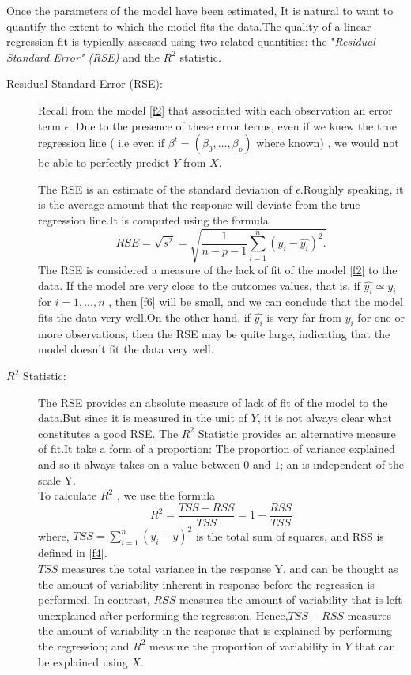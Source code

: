 \documentclass[12pt]{report}
\renewcommand{\emph}{\textit}
\begin{document}
	Once the parameters of the model have been estimated, It is natural to want to quantify the extent to which the model fits the data.The quality of a linear regression fit is typically assessed using two related quantities: the "\emph{Residual Standard Error" (RSE)} and the $R^{2}$ statistic.
	\begin{description}
		\item[Residual Standard Error (RSE):] Recall from the model \eqref{f2}  that associated with each observation an error term $\epsilon$ .Due to the presence of these error terms, even if we knew the true regression line ( i.e even if $\beta^{t}=(\beta_{0},...,\beta_{p})$ where known) , we would not be able to perfectly predict $Y$ from $X$.
		
		The RSE is an estimate of the standard deviation of $\epsilon$.Roughly speaking, it is the average amount that the response will deviate from the true regression line.It is computed using the formula
		\begin{equation}
			RSE=\sqrt{s^{2}}=\sqrt{\frac{1}{n-p-1}\sum_{i=1}^{n}(y_{i}-\hat{y_{i}})^{2}.
			} \label{f6}
		\end{equation}
		The RSE is considered a measure of the  lack of fit of the model \eqref{f2} to the data. If the model are very close to the outcomes values, that is, if $\hat{y_{i}}\simeq y_{i}$ for $i=1,...,n$ , then \eqref{f6} will be small, and we can conclude that the model fits the data very well.On the other hand, if $\hat{y_{i}}$  is very far from $y_{i}$  for one or more observations, then the RSE may be quite large, indicating that the model doesn't fit the data very well.
		\item[$R^{2}$ Statistic:] The RSE provides an absolute measure of lack of fit of the model to the data.But since it is measured in the unit of $Y$, it is not always clear what constitutes a good RSE. The $R^{2}$ Statistic provides an alternative measure of fit.It take a form of a proportion: The proportion of variance explained and so it always takes on a value between $0$ and $1$; an is independent of the scale Y.\\
		To calculate $R^{2}$ , we use the formula
		\begin{equation}
			R^{2}=\frac{TSS-RSS}{TSS}=1-\frac{RSS}{TSS}
			\label{f7}
		\end{equation}
		where, $TSS=\sum_{i=1}^{n}(y_{i}-\bar{y})^{2}$ is the total sum of squares, and RSS is defined in \eqref{f4}.\\
		$TSS$ measures the total variance in the response Y, and can be thought as the amount of variability inherent in response before the regression is performed. In contrast, $RSS$ measures the amount of variability that is left unexplained after performing the regression. Hence,$TSS-RSS$ measures the amount of variability in the response that is explained by performing the regression; and $R^{2}$ measure the proportion of variability in $Y$  that can be explained using $X$.
		

\end{description}
\end{document}
